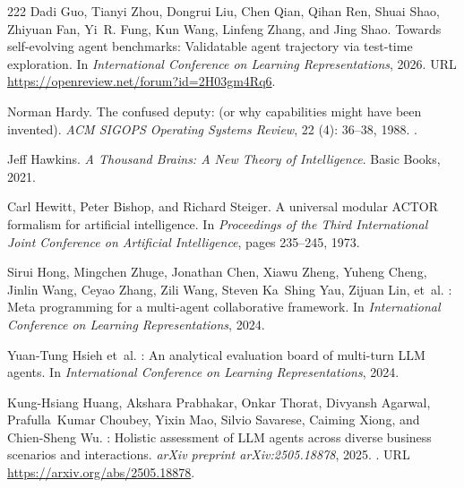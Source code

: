 \begin{thebibliography}{222}
Dadi Guo, Tianyi Zhou, Dongrui Liu, Chen Qian, Qihan Ren, Shuai Shao, Zhiyuan
  Fan, Yi~R. Fung, Kun Wang, Linfeng Zhang, and Jing Shao.
\newblock Towards self-evolving agent benchmarks: Validatable agent trajectory
  via test-time exploration.
\newblock In \emph{International Conference on Learning Representations}, 2026.
\newblock URL \url{https://openreview.net/forum?id=2H03gm4Rq6}.

Norman Hardy.
\newblock The confused deputy: (or why capabilities might have been invented).
\newblock \emph{ACM SIGOPS Operating Systems Review}, 22 (4):
  36--38, 1988.
\newblock {}.

Jeff Hawkins.
\newblock \emph{A Thousand Brains: A New Theory of Intelligence}.
\newblock Basic Books, 2021.

Carl Hewitt, Peter Bishop, and Richard Steiger.
\newblock A universal modular {ACTOR} formalism for artificial intelligence.
\newblock In \emph{Proceedings of the Third International Joint Conference on
  Artificial Intelligence}, pages 235--245, 1973.

Sirui Hong, Mingchen Zhuge, Jonathan Chen, Xiawu Zheng, Yuheng Cheng, Jinlin
  Wang, Ceyao Zhang, Zili Wang, Steven Ka~Shing Yau, Zijuan Lin, et~al.
: Meta programming for a multi-agent collaborative
  framework.
\newblock In \emph{International Conference on Learning Representations}, 2024.

Yuan-Tung Hsieh et~al.
: An analytical evaluation board of multi-turn {LLM}
  agents.
\newblock In \emph{International Conference on Learning Representations}, 2024.

Kung-Hsiang Huang, Akshara Prabhakar, Onkar Thorat, Divyansh Agarwal,
  Prafulla~Kumar Choubey, Yixin Mao, Silvio Savarese, Caiming Xiong, and
  Chien-Sheng Wu.
: Holistic assessment of {LLM} agents across diverse
  business scenarios and interactions.
\newblock \emph{arXiv preprint arXiv:2505.18878}, 2025.
\newblock {}.
\newblock URL \url{https://arxiv.org/abs/2505.18878}.


\end{thebibliography}
